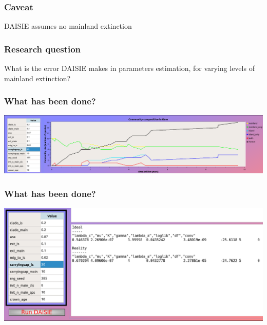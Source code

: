 \documentclass{beamer}
\begin{document}
\begin{frame}
  \frametitle{Caveat}

  DAISIE assumes no mainland extinction

\end{frame}

\begin{frame}
  \frametitle{Research question}

  What is the error DAISIE makes in parameters estimation, 
  for varying levels of mainland extinction?

\end{frame}

\begin{frame}
  \frametitle{What has been done?}

  \includegraphics[width=\textwidth]{elly_top_zoom.png}

\end{frame}

\begin{frame}
  \frametitle{What has been done?}

  \includegraphics[width=\textwidth]{elly_bottom_zoom.png}

\end{frame}
\end{document}
